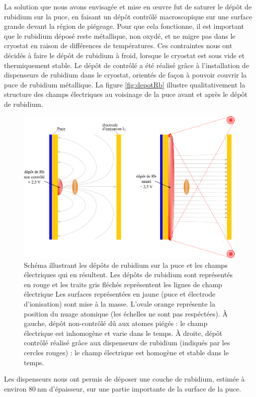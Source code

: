 La solution que nous avons envisagée et mise en \oe uvre fut de saturer le dépôt de rubidium sur la puce, en faisant un dépôt contrôlé macroscopique sur une surface grande devant la région de piégeage.
Pour que cela fonctionne, il est important que le rubidium déposé reste métallique, non oxydé, et ne migre pas dans le cryostat en raison de différences de températures.
Ces contraintes nous ont décidés à faire le dépôt de rubidium à froid, lorsque le cryostat est sous vide et thermiquement stable.
Le dépôt de contrôlé a été réalisé grâce à l'installation de dispenseurs de rubidium dans le cryostat, orientés de façon à pouvoir couvrir la puce de rubidium métallique.
La figure \eqref{fig:depotRb} illustre qualitativement la structure des champs électriques au voisinage de la puce avant et après le dépôt de rubidium.
%
\begin{figure}[h]
\centering
\includegraphics[width=.85\linewidth]{figures/depotRb}
\caption[Dépôt contrôlé de rubidium sur la puce]{
Schéma illustrant les dépôts de rubidium sur la puce et les champs électriques qui en résultent.
Les dépôts de rubidium sont représentés en rouge et les traits gris fléchés représentent les lignes de champ électrique
Les surfaces représentées en jaune (puce et électrode d'ionisation) sont mise à la masse.
L'ovale orange représente la position du nuage atomique (les échelles ne sont pas respéctées).
\`A gauche, dépôt non-contrôlé dû aux atomes piégés : le champ électrique est inhomogène  et varie dans le temps.
\`A droite, dépôt contrôlé réalisé grâce aux dispenseurs de rubidium (indiqués par les cercles rouges) : le champ électrique est homogène et stable dans le temps.
}
\label{fig:depotRb}
\end{figure}

Les dispenseurs nous ont permis de déposer une couche de rubidium, estimée à environ $\SI{80}{\nano\meter}$ d'épaisseur, sur une partie importante de la surface de la puce.

